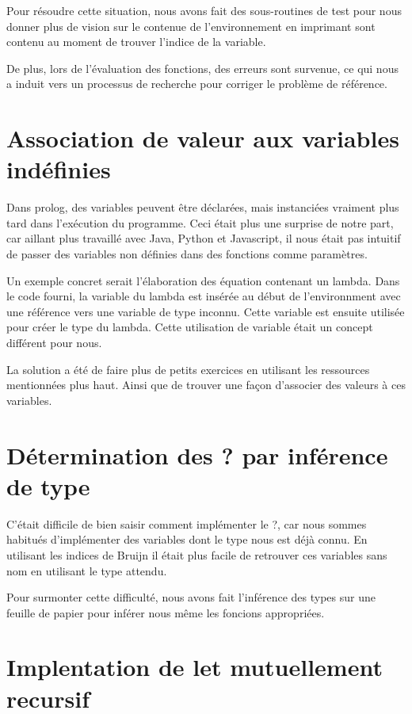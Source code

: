 \documentclass[12pt, letterpaper]{article}
\begin{document}
Pour résoudre cette situation, nous avons fait des sous-routines de test 
pour nous donner plus de vision sur le contenue de l'environnement en imprimant
sont contenu au moment de trouver l'indice de la variable.

De plus, lors de l'évaluation des fonctions, des erreurs sont survenue, ce qui
nous a induit vers un processus de recherche pour corriger le problème de 
référence.

\section*{Association de valeur aux variables indéfinies}

Dans prolog, des variables peuvent être déclarées, mais instanciées 
vraiment plus tard dans l'exécution du programme. Ceci était plus une surprise 
de notre part, car aillant plus travaillé avec Java, Python et Javascript,
il nous était pas intuitif de passer des variables non définies dans des 
fonctions comme paramètres.

Un exemple concret serait l'élaboration des équation contenant un lambda.
Dans le code fourni, la variable du lambda est insérée au début de 
l'environnment avec une référence vers une variable de type inconnu. Cette 
variable est ensuite utilisée pour créer le type du lambda. Cette utilisation 
de variable était un concept différent pour nous.

La solution a été de faire plus de petits exercices en utilisant les ressources 
mentionnées plus haut. Ainsi que de trouver une façon d'associer des valeurs 
à ces variables.

\section*{Détermination des ? par inférence de type}

C'était difficile de bien saisir comment implémenter le ?, car nous sommes 
habitués d'implémenter des variables dont le type nous est déjà connu.
En utilisant les indices de Bruijn il était plus facile de retrouver ces 
variables sans nom en utilisant le type attendu.

Pour surmonter cette difficulté, nous avons fait l'inférence des types sur
une feuille de papier pour inférer nous même les foncions appropriées.

\section*{Implentation de let mutuellement recursif}
\end{document}
